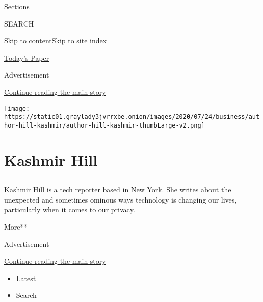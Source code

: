 Sections

SEARCH

\protect\hyperlink{site-content}{Skip to
content}\protect\hyperlink{site-index}{Skip to site index}

\href{https://myaccount.nytimes3xbfgragh.onion/auth/login?response_type=cookie\&client_id=vi}{}

\href{https://www.nytimes3xbfgragh.onion/section/todayspaper}{Today's
Paper}

Advertisement

\protect\hyperlink{after-top}{Continue reading the main story}

\texttt{[image: https://static01.graylady3jvrrxbe.onion/images/2020/07/24/business/author-hill-kashmir/author-hill-kashmir-thumbLarge-v2.png]}

\hypertarget{kashmir-hill}{%
\section{Kashmir Hill}\label{kashmir-hill}}

\subsection{}

Kashmir Hill is a tech reporter based in New York. She writes about the
unexpected and sometimes ominous ways technology is changing our lives,
particularly when it comes to our privacy.

More**

Advertisement

\protect\hyperlink{after-mid1}{Continue reading the main story}

\begin{itemize}
\tightlist
\item
  \protect\hyperlink{stream-panel}{Latest}
\item
  Search
\end{itemize}

